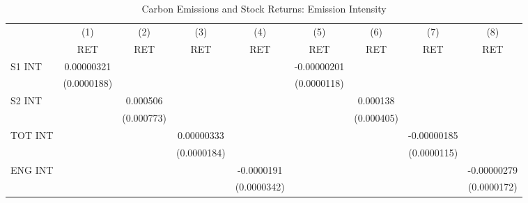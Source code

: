 \begin{table}[htbp]\centering
\def\sym#1{\ifmmode^{#1}\else\(^{#1}\)\fi}
\caption{Carbon Emissions and Stock Returns: Emission Intensity}
\begin{tabular}{l*{8}{c}}
\hline\hline
                    &\multicolumn{1}{c}{(1)}&\multicolumn{1}{c}{(2)}&\multicolumn{1}{c}{(3)}&\multicolumn{1}{c}{(4)}&\multicolumn{1}{c}{(5)}&\multicolumn{1}{c}{(6)}&\multicolumn{1}{c}{(7)}&\multicolumn{1}{c}{(8)}\\
                    &\multicolumn{1}{c}{RET}&\multicolumn{1}{c}{RET}&\multicolumn{1}{c}{RET}&\multicolumn{1}{c}{RET}&\multicolumn{1}{c}{RET}&\multicolumn{1}{c}{RET}&\multicolumn{1}{c}{RET}&\multicolumn{1}{c}{RET}\\
\hline
S1 INT              &  0.00000321         &                     &                     &                     & -0.00000201         &                     &                     &                     \\
                    & (0.0000188)         &                     &                     &                     & (0.0000118)         &                     &                     &                     \\
S2 INT              &                     &    0.000506         &                     &                     &                     &    0.000138         &                     &                     \\
                    &                     &  (0.000773)         &                     &                     &                     &  (0.000405)         &                     &                     \\
TOT INT             &                     &                     &  0.00000333         &                     &                     &                     & -0.00000185         &                     \\
                    &                     &                     & (0.0000184)         &                     &                     &                     & (0.0000115)         &                     \\
ENG INT             &                     &                     &                     &  -0.0000191         &                     &                     &                     & -0.00000279         \\
                    &                     &                     &                     & (0.0000342)         &                     &                     &                     & (0.0000172)         \\

\end{tabular}
\end{table}
